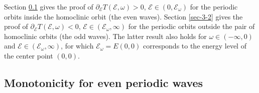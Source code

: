 \documentclass[12pt,reqno]{amsart}
\numberwithin{equation}{section}
\numberwithin{figure}{section}
\begin{document}
Section \ref{sec-3-1} gives the proof of $\partial_{\mathcal{E}} T(\mathcal{E},\omega) > 0$, $\mathcal{E} \in (0,\mathcal{E}_{\omega})$ for 
the periodic orbits inside the homoclinic orbit (the even waves). 
Section \ref{sec-3-2} gives the proof of $\partial_{\mathcal{E}} T(\mathcal{E},\omega) < 0$, $\mathcal{E} \in (\mathcal{E}_{\omega},\infty)$ for 
the periodic orbits outside the pair of homoclinic orbits (the odd waves). 
The latter result also holds for $\omega \in (-\infty,0)$ and $\mathcal{E} \in (\mathcal{E}_{\omega},\infty)$, for which $\mathcal{E}_{\omega} = E(0,0)$ corresponds to the energy level of the center point $(0,0)$.


\subsection{Monotonicity for even periodic waves}
\label{sec-3-1}
\end{document}
